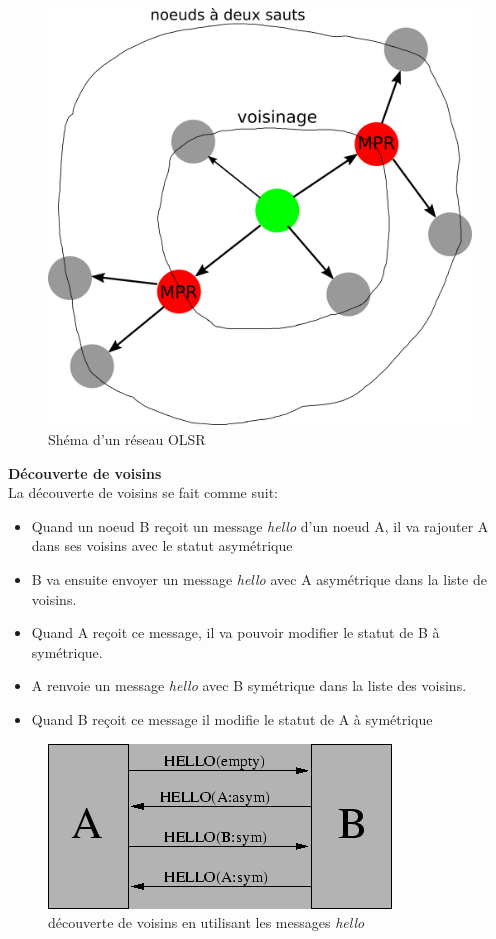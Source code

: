     \begin{figure}[H]
        \centering
        \includegraphics[scale=0.5]{images/olsr.png}
        \caption{Shéma d'un réseau OLSR}
        \label{olsr}
    \end{figure}
    \textbf{Découverte de voisins}\\
    La découverte de voisins se fait comme suit:
    \begin{itemize}
        \item Quand un noeud B reçoit un message \textit{hello} d'un noeud A,
            il va rajouter A dans ses voisins avec le statut asymétrique
        \item B va ensuite envoyer un message \textit{hello} avec A asymétrique dans la liste de voisins.
        \item Quand A reçoit ce message, il va pouvoir modifier le statut de B à symétrique.
        \item A renvoie un message \textit{hello} avec B symétrique dans la liste des voisins.
        \item Quand B reçoit ce message il modifie le statut de A à symétrique
    \end{itemize}
    \begin{figure}[H]
        \centering
        \includegraphics[scale=0.6]{images/olsr_neighborDiscovery.png}
        \caption{découverte de voisins en utilisant les messages \textit{hello} \cite{olsr_neighborDiscovery_w}}
        \label{olsr_neighborDiscovery}
    \end{figure}
